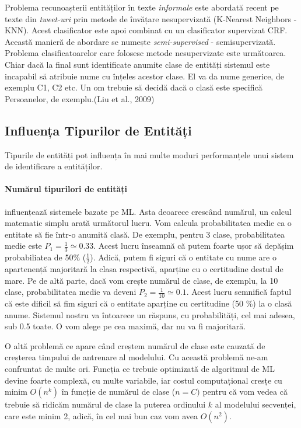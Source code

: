 Problema recunoașterii entităților în texte \textit{informale} este abordată recent pe texte din \textit{tweet-uri} prin metode de învățare nesupervizată (K-Nearest Neighbors - KNN). Acest clasificator este apoi combinat cu un clasificator supervizat CRF. Această manieră de abordare se numește \textit{semi-supervised} - semisupervizată. Problema clasificatoarelor care folosesc metode nesupervizate este următoarea. Chiar dacă la final sunt identificate anumite clase de entități sistemul este incapabil să atribuie nume cu înțeles acestor clase. El va da nume generice, de exemplu C1, C2 etc. Un om trebuie să decidă dacă o clasă este specifică Persoanelor, de exemplu.(Liu et al., 2009)\cite{Liu_recognizingnamed}


\subsection{Influența Tipurilor de Entități}

Tipurile de entități pot influența în mai multe moduri performanțele unui sistem de identificare a entităților. 

\paragraph{Numărul tipurilori de entități}

influențează sistemele bazate pe ML. Asta deoarece crescând numărul, un calcul matematic simplu arată următorul lucru. Vom calcula probabilitatea medie ca o entitate să fie într-o anumită clasă. De exemplu, pentru 3 clase, probabilitatea medie este $ P_1 = \frac{1}{3} \simeq 0.33 $. Acest lucru înseamnă că putem foarte ușor să depășim probabiliatea de 50\% ($ \frac{1}{2} $). Adică, putem fi siguri că o entitate cu nume are o apartenență majoritară la clasa respectivă, aparține cu o certitudine destul de mare. Pe de altă parte, dacă vom crește numărul de clase, de exemplu, la 10 clase, probabilitatea medie va deveni $ P_2 = \frac{1}{10} \simeq 0.1 $. Acest lucru semnifică faptul că este dificil să fim siguri că o entitate aparține cu certitudine (50 \%) la o clasă anume. Sistemul nostru va întoarece un răspuns, cu probabilități, cel mai adesea, sub 0.5 toate. O vom alege pe cea maximă, dar nu va fi majoritară. 

O altă problemă ce apare când creștem numărul de clase este cauzată de creșterea timpului de antrenare al modelului. Cu această problemă ne-am confruntat de multe ori. Funcția ce trebuie optimizată de algoritmul de ML devine foarte complexă, cu multe variabile, iar costul computațional cresțe cu minim $ O(n^k) $ în funcție de numărul de clase ($n = C)$ pentru că vom vedea că trebuie să ridicăm numărul de clase la puterea ordinului $k$ al modelului secvenței, care este minim 2, adică, în cel mai bun caz vom avea $ O(n^2) $.

